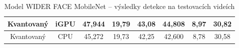 \begin{table}[H]
\begin{tabular}{cc|ccc|ccc|}
  \multicolumn{1}{|c|}{\cellcolor[HTML]{E0DBDB}Kvantovaný}     & \cellcolor[HTML]{E0DBDB}iGPU & \multicolumn{1}{c|}{47,944}                                 & \multicolumn{1}{c|}{19,79}                                  & 43,08          & \multicolumn{1}{c|}{44,808}                                 & \multicolumn{1}{c|}{8,97}                                   & 30,82          \\ \hline
  \multicolumn{1}{|c|}{\cellcolor[HTML]{E0DBDB}Kvantovaný}     & \cellcolor[HTML]{E0DBDB}CPU  & \multicolumn{1}{c|}{45,272}                                 & \multicolumn{1}{c|}{19,73}                                  & 42,25          & \multicolumn{1}{c|}{42,600}                                 & \multicolumn{1}{c|}{8,78}                                   & 30,58          \\ \hline
  \end{tabular}
  \label{tabulka:wfmvidea}
  \caption{Model WIDER FACE MobileNet -- výsledky detekce na testovacích videích}
\end{table}


